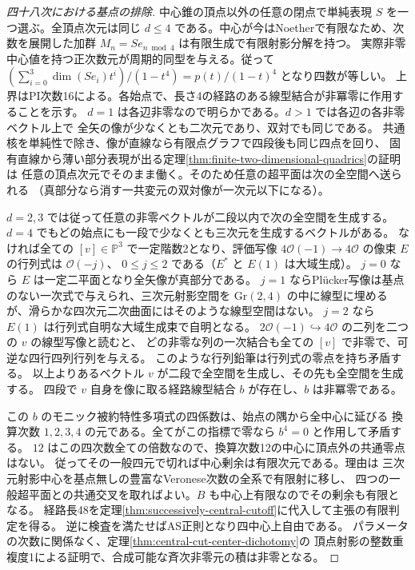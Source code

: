 \begin{proof}[四十八次における基点の排除]
中心錐の頂点以外の任意の閉点で単純表現 $S$ を一つ選ぶ。全頂点次元は同じ
$d\le4$ である。中心が今はNoetherで有限なため、次数を展開した加群
$M_n=Se_{n\bmod4}$ は有限生成で有限射影分解を持つ。
実際非零中心値を持つ正次数元が周期的同型を与える。従って
$(\sum_{i=0}^3\dim(Se_i)t^i)/(1-t^4)=p(t)/(1-t)^4$ となり四数が等しい。
上界はPI次数16による。各始点で、長さ4の経路のある線型結合が非冪零に作用することを示す。
$d=1$ は各辺非零なので明らかである。$d>1$ では各辺の各非零ベクトル上で
全矢の像が少なくとも二次元であり、双対でも同じである。
共通核を単純性で除き、像が直線なら有限点グラフで四段後も同じ四点を回り、
固有直線から薄い部分表現が出る定理\ref{thm:finite-two-dimensional-quadrics}の証明は
任意の頂点次元でそのまま働く。そのため任意の超平面は次の全空間へ送られる
（真部分なら消す一共変元の双対像が一次元以下になる）。

$d=2,3$ では従って任意の非零ベクトルが二段以内で次の全空間を生成する。
$d=4$ でもどの始点にも一段で少なくとも三次元を生成するベクトルがある。
なければ全ての $[v]\in\mathbb P^3$ で一定階数2となり、評価写像
$4\mathcal O(-1)\to4\mathcal O$ の像束 $E$ の行列式は $\mathcal O(-j)$、
$0\le j\le2$ である（$E^*$ と $E(1)$ は大域生成）。
$j=0$ なら $E$ は一定二平面となり全矢像が真部分である。
$j=1$ ならPl\"ucker写像は基点のない一次式で与えられ、三次元射影空間を
$\mathrm{Gr}(2,4)$ の中に線型に埋めるが、滑らかな四次元二次曲面にはそのような線型空間はない。
$j=2$ なら $E(1)$ は行列式自明な大域生成束で自明となる。
$2\mathcal O(-1)\hookrightarrow4\mathcal O$ の二列を二つの $v$ の線型写像と読むと、
どの非零な列の一次結合も全ての $[v]$ で非零で、可逆な四行四列行列を与える。
このような行列鉛筆は行列式の零点を持ち矛盾する。
以上よりあるベクトル $v$ が二段で全空間を生成し、その先も全空間を生成する。
四段で $v$ 自身を像に取る経路線型結合 $b$ が存在し、$b$ は非冪零である。

この $b$ のモニック被約特性多項式の四係数は、始点の隅から全中心に延びる
換算次数 $1,2,3,4$ の元である。全てがこの指標で零なら $b^4=0$ と作用して矛盾する。
$12$ はこの四次数全ての倍数なので、換算次数12の中心に頂点外の共通零点はない。
従ってその一般四元で切れば中心剰余は有限次元である。理由は
三次元射影中心を基点無しの豊富なVeronese次数の全系で有限射に移し、
四つの一般超平面との共通交叉を取ればよい。$B$ も中心上有限なのでその剰余も有限となる。
経路長48を定理\ref{thm:successively-central-cutoff}に代入して主張の有限判定を得る。
逆に検査を満たせばAS正則となり四中心上自由である。
パラメータの次数に関係なく、定理\ref{thm:central-cut-center-dichotomy}の
頂点射影の整数重複度1による証明で、合成可能な斉次非零元の積は非零となる。
\end{proof}

